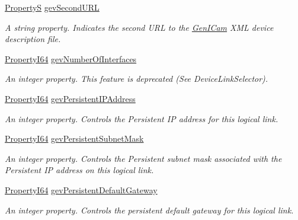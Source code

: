 \begin{DoxyCompactItemize}
\hyperlink{classmv_i_m_p_a_c_t_1_1acquire_1_1_property_s}{Property\+S} \hyperlink{classmv_i_m_p_a_c_t_1_1acquire_1_1_gen_i_cam_1_1_transport_layer_control_aed5fe31d65a43e3f9e314e28f3c126db}{gev\+Second\+U\+R\+L}
\begin{DoxyCompactList}\small\item\em A string property. Indicates the second U\+R\+L to the \hyperlink{namespacemv_i_m_p_a_c_t_1_1acquire_1_1_gen_i_cam}{Gen\+I\+Cam} X\+M\+L device description file. \end{DoxyCompactList}\item 
\hyperlink{group___common_interface_ga81749b2696755513663492664a18a893}{Property\+I64} \hyperlink{classmv_i_m_p_a_c_t_1_1acquire_1_1_gen_i_cam_1_1_transport_layer_control_ace62c05c2965a8a3d57157051b0f3174}{gev\+Number\+Of\+Interfaces}
\begin{DoxyCompactList}\small\item\em An integer property. This feature is deprecated (See Device\+Link\+Selector). \end{DoxyCompactList}\item 
\hyperlink{group___common_interface_ga81749b2696755513663492664a18a893}{Property\+I64} \hyperlink{classmv_i_m_p_a_c_t_1_1acquire_1_1_gen_i_cam_1_1_transport_layer_control_a83b97485aff8b1613a8667d96470ee32}{gev\+Persistent\+I\+P\+Address}
\begin{DoxyCompactList}\small\item\em An integer property. Controls the Persistent I\+P address for this logical link. \end{DoxyCompactList}\item 
\hyperlink{group___common_interface_ga81749b2696755513663492664a18a893}{Property\+I64} \hyperlink{classmv_i_m_p_a_c_t_1_1acquire_1_1_gen_i_cam_1_1_transport_layer_control_aaaace291a6f4986f4dd872d9b74102b8}{gev\+Persistent\+Subnet\+Mask}
\begin{DoxyCompactList}\small\item\em An integer property. Controls the Persistent subnet mask associated with the Persistent I\+P address on this logical link. \end{DoxyCompactList}\item 
\hyperlink{group___common_interface_ga81749b2696755513663492664a18a893}{Property\+I64} \hyperlink{classmv_i_m_p_a_c_t_1_1acquire_1_1_gen_i_cam_1_1_transport_layer_control_ae35c08fe9888c13ef3e608db00fdd73d}{gev\+Persistent\+Default\+Gateway}
\begin{DoxyCompactList}\small\item\em An integer property. Controls the persistent default gateway for this logical link. \end{DoxyCompactList}\item 

\end{DoxyCompactItemize}
